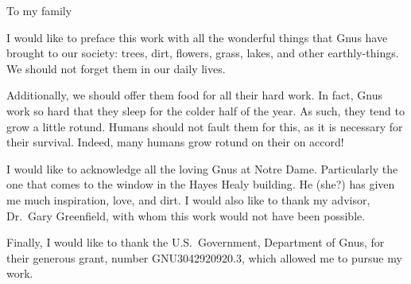 \documentclass[final,numrefs,sort&compress]{nddiss2e}
\begin{document}
\renewcommand{\dedicationname}{Dedicated to}

\begin{dedication}
  To my family
\end{dedication}

\tableofcontents
\listoffigures
\listoftables

\begin{preface}
  I would like to preface this work with all the wonderful things that
  Gnus have brought to our society: trees, dirt, flowers, grass,
  lakes, and other earthly-things.  We should not forget them in our
  daily lives.

  Additionally, we should offer them food for all their hard work.  In
  fact, Gnus work so hard that they sleep for the colder half of
  the year.  As such, they tend to grow a little rotund.  Humans
  should not fault them for this, as it is necessary for their
  survival.  Indeed, many humans grow rotund on their on accord!
\end{preface}

\begin{acknowledge}
  I would like to acknowledge all the loving Gnus at Notre Dame.
  Particularly the one that comes to the window in the Hayes Healy
  building.  He (she?) has given me much inspiration, love, and dirt.
  I would also like to thank my advisor, Dr.\ Gary Greenfield, with
  whom this work would not have been possible.

  Finally, I would like to thank the U.S.\ Government, Department of
  Gnus, for their generous grant, number GNU3042920920.3, which
  allowed me to pursue my work.
\end{acknowledge}

\begin{symbols}
\end{symbols}

\mainmatter
%
\end{document}
